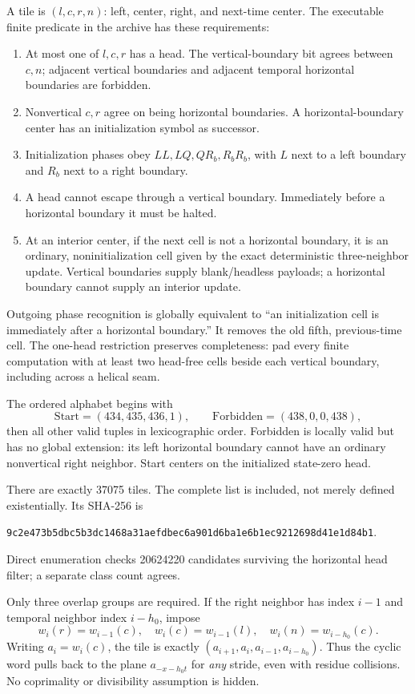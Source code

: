 \documentclass[11pt]{article}
\begin{document}
A tile is $(l,c,r,n)$: left, center, right, and next-time center. The executable finite predicate in the archive has these requirements:
\begin{enumerate}
\item At most one of $l,c,r$ has a head. The vertical-boundary bit agrees between $c,n$; adjacent vertical boundaries and adjacent temporal horizontal boundaries are forbidden.
\item Nonvertical $c,r$ agree on being horizontal boundaries. A horizontal-boundary center has an initialization symbol as successor.
\item Initialization phases obey $LL,LQ,QR_b,R_bR_b$, with $L$ next to a left boundary and $R_b$ next to a right boundary.
\item A head cannot escape through a vertical boundary. Immediately before a horizontal boundary it must be halted.
\item At an interior center, if the next cell is not a horizontal boundary, it is an ordinary, noninitialization cell given by the exact deterministic three-neighbor update. Vertical boundaries supply blank/headless payloads; a horizontal boundary cannot supply an interior update.
\end{enumerate}
Outgoing phase recognition is globally equivalent to ``an initialization cell is immediately after a horizontal boundary.'' It removes the old fifth, previous-time cell. The one-head restriction preserves completeness: pad every finite computation with at least two head-free cells beside each vertical boundary, including across a helical seam.

The ordered alphabet begins with
\[
\mathrm{Start}=(434,435,436,1),\qquad
\mathrm{Forbidden}=(438,0,0,438),
\]
then all other valid tuples in lexicographic order. Forbidden is locally valid but has no global extension: its left horizontal boundary cannot have an ordinary nonvertical right neighbor. Start centers on the initialized state-zero head.

There are exactly 37075 tiles. The complete list is included, not merely defined existentially. Its SHA-256 is
\begin{center}\small\texttt{9c2e473b5dbc5b3dc1468a31aefdbec6a901d6ba1e6b1ec9212698d41e1d84b1}.\end{center}
Direct enumeration checks 20624220 candidates surviving the horizontal head filter; a separate class count agrees.

Only three overlap groups are required. If the right neighbor has index $i-1$ and temporal neighbor index $i-h_0$, impose
\[
w_i(r)=w_{i-1}(c),\quad w_i(c)=w_{i-1}(l),\quad
w_i(n)=w_{i-h_0}(c).
\]
Writing $a_i=w_i(c)$, the tile is exactly $(a_{i+1},a_i,a_{i-1},a_{i-h_0})$. Thus the cyclic word pulls back to the plane $a_{-x-h_0t}$ for \emph{any} stride, even with residue collisions. No coprimality or divisibility assumption is hidden.
\end{document}
